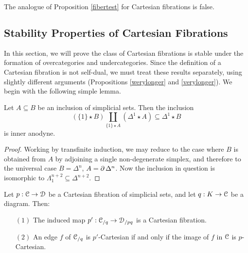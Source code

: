 \begin{remark}
The analogue of Proposition \ref{fibertest} for Cartesian fibrations is false.
\end{remark}

\subsection{Stability Properties of Cartesian Fibrations}\label{slib}

In this section, we will prove the class of Cartesian fibrations is stable under the formation of overcategories and undercategories. Since the definition of a Cartesian fibration is not self-dual, we must treat these results separately, using slightly different arguments (Propositions \ref{werylonger} and \ref{verylonger}). We begin with the following simple lemma.

\begin{lemma}\label{doweneed}
Let $A \subseteq B$ be an inclusion of simplicial sets. Then the inclusion
$$ (\{1\} \star B) \coprod_{ \{1\} \star A } (\Delta^1 \star A ) \subseteq \Delta^1 \star B$$ is inner anodyne.
\end{lemma}

\begin{proof}
Working by transfinite induction, we may reduce to the case where $B$ is obtained from $A$ by adjoining a single non-degenerate simplex, and therefore to the universal case
$B = \Delta^n$, $A = \operatorname{\partial} \Delta^n$. Now the inclusion in question is isomorphic to $\Lambda^{n+2}_{1} \subseteq \Delta^{n+2}$.
\end{proof}

\begin{proposition}\label{werylonger}
Let $p: \operatorname{\mathcal{C}} \rightarrow \operatorname{\mathcal{D}}$ be a Cartesian fibration of simplicial sets, and let
$q: K \rightarrow \operatorname{\mathcal{C}}$ be a diagram. Then:
\begin{itemize}
\item[$(1)$] The induced map $p': \operatorname{\mathcal{C}}_{/q} \rightarrow \operatorname{\mathcal{D}}_{/pq}$ is a Cartesian fibration.
\item[$(2)$] An edge $f$ of $\operatorname{\mathcal{C}}_{/q}$ is $p'$-Cartesian if and only if the image
of $f$ in $\operatorname{\mathcal{C}}$ is $p$-Cartesian.
\end{itemize}
\end{proposition}

